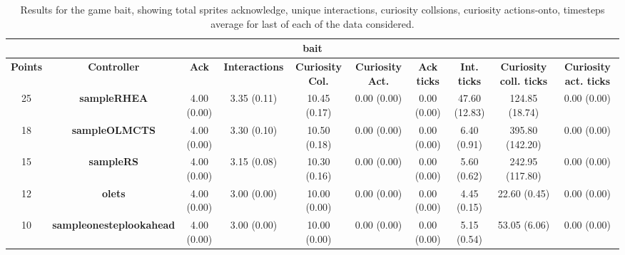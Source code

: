 \begin{table*}[!t]
\begin{center}
\begin{adjustbox}{width=1\textwidth}
\begin{tabular}{|c|c|c|c|c|c|c|c|c|c|}
\multicolumn{10}{c}{\textbf{bait}}\\
\hline
\textbf{Points} & \textbf{Controller} & \textbf{Ack} & \textbf{Interactions} & \textbf{Curiosity Col.} & \textbf{Curiosity Act.} & \textbf{Ack ticks} & \textbf{Int. ticks} & \textbf{Curiosity coll. ticks} & \textbf{Curiosity act. ticks}\\
\hline
25 & \textbf{sampleRHEA} & 4.00 (0.00) & 3.35 (0.11) & 10.45 (0.17) & 0.00 (0.00) & 0.00 (0.00) & 47.60 (12.83) & 124.85 (18.74) & 0.00 (0.00)
 \\
\hline
18 & \textbf{sampleOLMCTS} & 4.00 (0.00) & 3.30 (0.10) & 10.50 (0.18) & 0.00 (0.00) & 0.00 (0.00) & 6.40 (0.91) & 395.80 (142.20) & 0.00 (0.00)
 \\
\hline
15 & \textbf{sampleRS} & 4.00 (0.00) & 3.15 (0.08) & 10.30 (0.16) & 0.00 (0.00) & 0.00 (0.00) & 5.60 (0.62) & 242.95 (117.80) & 0.00 (0.00)
 \\
\hline
12 & \textbf{olets} & 4.00 (0.00) & 3.00 (0.00) & 10.00 (0.00) & 0.00 (0.00) & 0.00 (0.00) & 4.45 (0.15) & 22.60 (0.45) & 0.00 (0.00)
 \\
\hline
10 & \textbf{sampleonesteplookahead} & 4.00 (0.00) & 3.00 (0.00) & 10.00 (0.00) & 0.00 (0.00) & 0.00 (0.00) & 5.15 (0.54) & 53.05 (6.06) & 0.00 (0.00)
 \\
\hline
\end{tabular}
\end{adjustbox}
\caption{Results for the game bait, showing total sprites acknowledge, unique interactions, curiosity collsions, curiosity actions-onto, timesteps average for last of each of the data considered.}
\label{tab:weights}
\end{center}
\end{table*}

